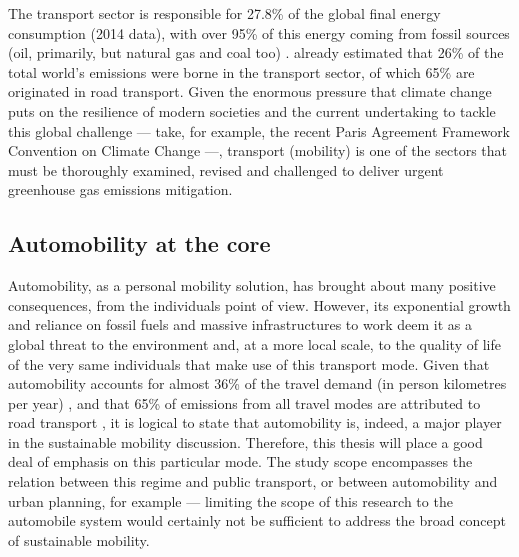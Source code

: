 The transport sector is responsible for 27.8\% of the global final energy consumption (2014 data), with over 95\% of this energy coming from fossil sources (oil, primarily, but natural gas and coal too) \parencite{iea2017_Statisticswebportal}. \textcite{chapman2007_Transportclimatechange} already estimated that 26\% of the total world's  emissions were borne in the transport sector, of which 65\% are originated in road transport. Given the enormous pressure that climate change puts on the resilience of modern societies \parencite{ipcc2014_ClimateChange2014} and the current undertaking to tackle this global challenge --- take, for example, the recent Paris Agreement Framework Convention on Climate Change \parencite{clemencon2016_TwoSidesParis} ---, transport (mobility) is one of the sectors that must be thoroughly examined, revised and challenged to deliver urgent greenhouse gas emissions mitigation.

\subsection*{Automobility at the core}
\label{ss:intro:automobility-at-core}
Automobility, as a personal mobility solution, has brought about many positive consequences, from the individuals point of view. However, its exponential growth and reliance on fossil fuels and massive infrastructures to work deem it as a global threat to the environment and, at a more local scale, to the quality of life of the very same individuals that make use of this transport mode. Given that automobility accounts for almost 36\% of the travel demand (in person kilometres per year) \parencite{vuuren2017_Energylanduse}, and that 65\% of  emissions from all travel modes are attributed to road transport \parencite{chapman2007_Transportclimatechange}, it is logical to state that automobility is, indeed, a major player in the sustainable mobility discussion. Therefore, this thesis will place a good deal of emphasis on this particular mode. The study scope encompasses the relation between this regime and public transport, or between automobility and urban planning, for example --- limiting the scope of this research to the automobile system would certainly not be sufficient to address the broad concept of sustainable mobility.

%
%
